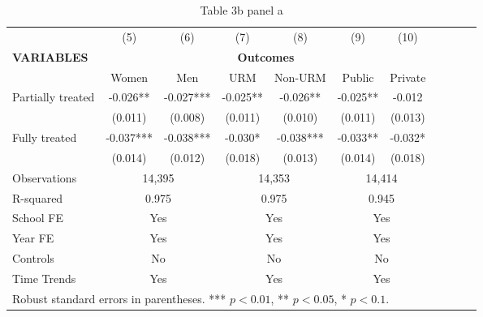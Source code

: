 \documentclass{article}
\begin{document}
\begin{table}[htbp]
\centering
\caption{Table 3b panel a}
\begin{tabular}{lcccccccccc}
\toprule
 & (5) & (6) & (7) & (8) & (9) & (10) \\
\cmidrule(lr){2-7}
\textbf{VARIABLES} & \multicolumn{6}{c}{\textbf{Outcomes}} \\
\cmidrule(lr){2-7}
 & Women & Men & URM & Non-URM & Public & Private \\
\midrule
Partially treated & -0.026** & -0.027*** & -0.025** & -0.026** & -0.025** & -0.012 \\
 & (0.011) & (0.008) & (0.011) & (0.010) & (0.011) & (0.013) \\
Fully treated & -0.037*** & -0.038*** & -0.030* & -0.038*** & -0.033** & -0.032* \\
 & (0.014) & (0.012) & (0.018) & (0.013) & (0.014) & (0.018) \\
\midrule
Observations & \multicolumn{2}{c}{14,395} & \multicolumn{2}{c}{14,353} & \multicolumn{2}{c}{14,414} \\
R-squared & \multicolumn{2}{c}{0.975} & \multicolumn{2}{c}{0.975} & \multicolumn{2}{c}{0.945} \\
\midrule
School FE & \multicolumn{2}{c}{Yes} & \multicolumn{2}{c}{Yes} & \multicolumn{2}{c}{Yes} \\
Year FE & \multicolumn{2}{c}{Yes} & \multicolumn{2}{c}{Yes} & \multicolumn{2}{c}{Yes} \\
Controls & \multicolumn{2}{c}{No} & \multicolumn{2}{c}{No} & \multicolumn{2}{c}{No} \\
Time Trends & \multicolumn{2}{c}{Yes} & \multicolumn{2}{c}{Yes} & \multicolumn{2}{c}{Yes} \\
\bottomrule
\multicolumn{7}{l}{\footnotesize Robust standard errors in parentheses. *** $p<0.01$, ** $p<0.05$, * $p<0.1$.}
\end{tabular}
\end{table}

\end{document}
